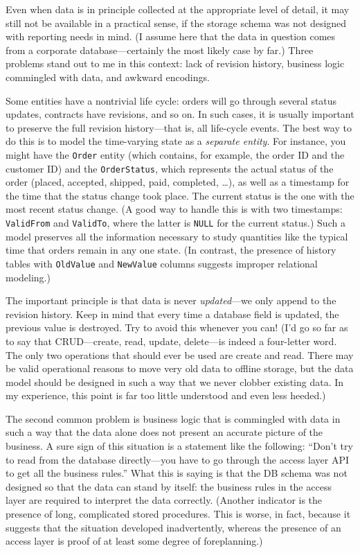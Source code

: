Even when data is in principle collected at the appropriate level of
detail, it may still not be available in a practical sense, if the
storage schema was not designed with reporting needs in mind. (I
assume here that the data in question comes from a corporate
database---certainly the most likely case by far.)  Three problems
stand out to me in this context: lack of revision history, business
logic commingled with data, and awkward encodings.
    
Some entities have a nontrivial life cycle: orders will go through
several status updates, contracts have revisions, and so on. In such
cases, it is usually important to preserve the full revision
history---that is, all life-cycle events. The best way to do this is
to model the time-varying state as a \emph{separate entity}. For
instance, you might have the \texttt{Order} entity (which contains,
for example, the order ID and the customer ID) and the \texttt{OrderStatus},
which represents the actual status of the order (placed, accepted,
shipped, paid, completed, \dots), as well as a timestamp for the time
that the status change took place. The current status is the one with
the most recent status change. (A good way to handle this is with two
timestamps: \texttt{ValidFrom} and \texttt{ValidTo}, where the latter
is \texttt{NULL} for the current status.)  Such a model preserves all
the information necessary to study quantities like the typical time
that orders remain in any one state. (In contrast, the presence of
history tables with \texttt{OldValue} and \texttt{NewValue} columns
suggests improper relational modeling.)
    
The important principle is that data is never \emph{updated}---we only
append to the revision history. Keep in mind that every time a
database field is updated, the previous value is destroyed. Try to
avoid this whenever you can! (I'd go so far as to say that
CRUD---create, read, update, delete---is indeed a four-letter word.
The only two operations that should ever be used are create and read.
There may be valid operational reasons to move very old data to
offline storage, but the data model should be designed in such a way
that we never clobber existing data. In my experience, this point is
far too little understood and even less heeded.)
    
The second common problem is business logic that is commingled with
data in such a way that the data alone does not present an accurate
picture of the business.  A sure sign of this situation is a statement
like the following: ``Don't try to read from the database
directly---you have to go through the access layer API to get all the
business rules.'' What this is saying is that the DB schema was not
designed so that the data can stand by itself: the business rules in
the access layer are required to interpret the data correctly.
(Another indicator is the presence of long, complicated stored
procedures.  This is worse, in fact, because it suggests that the
situation developed inadvertently, whereas the presence of an access
layer is proof of at least some degree of foreplanning.)
    
